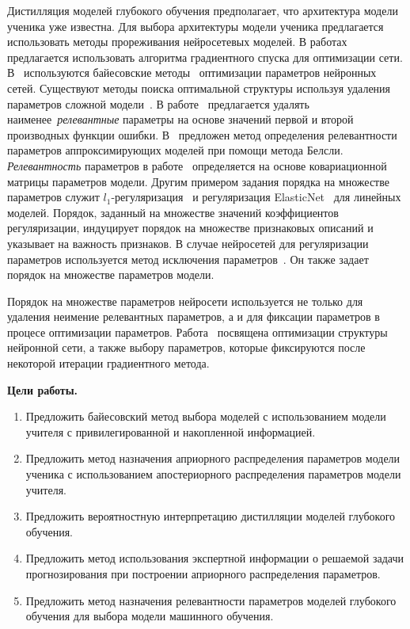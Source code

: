 Дистилляция моделей глубокого обучения предполагает, что архитектура модели ученика уже известна. Для выбора архитектуры модели ученика предлагается использовать методы прореживания нейросетевых моделей. В работах~\cite{maclarin2015, luketina2015} предлагается использовать алгоритма градиентного спуска для оптимизации сети. В~\cite{molchanov2017} используются байесовские методы~\cite{neal1995} оптимизации параметров нейронных сетей. Существуют методы поиска оптимальной структуры используя удаления параметров сложной модели~\cite{cun1990, louizos2017, graves2011}. В работе~\cite{cun1990} предлагается удалять наименее~\textit{релевантные} параметры на основе значений первой и второй производных функции ошибки. В~\cite{grabovoy2019} предложен метод определения релевантности параметров аппроксимирующих моделей при помощи метода Белсли. \textit{Релевантность} параметров в работе~\cite{grabovoy2019} определяется на основе ковариационной матрицы параметров модели.
Другим примером задания порядка на множестве параметров служит $l_1$-регуляризация~\cite{Tibshirani1996} и регуляризация ElasticNet~\cite{Hastie2005} для линейных моделей.
Порядок, заданный на множестве значений коэффициентов регуляризации, индуцирует порядок на множестве признаковых описаний и указывает на важность признаков.
В случае нейросетей для регуляризации параметров используется метод исключения параметров~\cite{srivastava2014, molchanov2017}.
Он также задает порядок на множестве параметров модели.

Порядок на множестве параметров нейросети используется не только для удаления неимение релевантных параметров, а и для фиксации параметров в процесе оптимизации параметров. Работа~\cite{grabovoy2020} посвящена оптимизации структуры нейронной сети, а также выбору параметров, которые фиксируются после некоторой итерации градиентного метода. 


\vspace{0.5cm}
\textbf{Цели работы.}
\vspace{0.2cm}
\begin{enumerate}
\item Предложить байесовский метод выбора моделей с использованием модели учителя с привилегированной и накопленной информацией.
\item Предложить метод назначения априорного распределения параметров модели ученика с использованием апостериорного распределения параметров модели учителя.
\item Предложить вероятностную интерпретацию дистилляции моделей глубокого обучения.
\item Предложить метод использования экспертной информации о решаемой задачи прогнозирования при построении априорного распределения параметров.
\item Предложить метод назначения релевантности параметров моделей глубокого обучения для выбора модели машинного обучения.
\end{enumerate}

